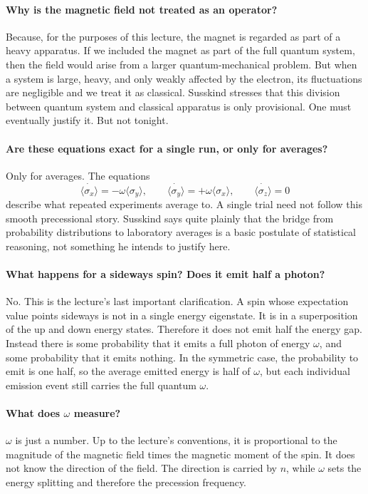\paragraph{Why is the magnetic field not treated as an operator?}
Because, for the purposes of this lecture, the magnet is regarded as part of a heavy apparatus. If we included the magnet as part of the full quantum system, then the field would arise from a larger quantum-mechanical problem. But when a system is large, heavy, and only weakly affected by the electron, its fluctuations are negligible and we treat it as classical. Susskind stresses that this division between quantum system and classical apparatus is only provisional. One must eventually justify it. But not tonight.

\paragraph{Are these equations exact for a single run, or only for averages?}
Only for averages. The equations
\begin{equation}
\dot{\langle \sigma_x\rangle}=-\omega\langle \sigma_y\rangle,
\qquad
\dot{\langle \sigma_y\rangle}=+\omega\langle \sigma_x\rangle,
\qquad
\dot{\langle \sigma_z\rangle}=0
\end{equation}
describe what repeated experiments average to. A single trial need not follow this smooth precessional story. Susskind says quite plainly that the bridge from probability distributions to laboratory averages is a basic postulate of statistical reasoning, not something he intends to justify here.

\paragraph{What happens for a sideways spin? Does it emit half a photon?}
No. This is the lecture's last important clarification. A spin whose expectation value points sideways is not in a single energy eigenstate. It is in a superposition of the up and down energy states. Therefore it does not emit half the energy gap. Instead there is some probability that it emits a full photon of energy \(\omega\), and some probability that it emits nothing. In the symmetric case, the probability to emit is one half, so the average emitted energy is half of \(\omega\), but each individual emission event still carries the full quantum \(\omega\).

\paragraph{What does \(\omega\) measure?}
\(\omega\) is just a number. Up to the lecture's conventions, it is proportional to the magnitude of the magnetic field times the magnetic moment of the spin. It does not know the direction of the field. The direction is carried by \(n\), while \(\omega\) sets the energy splitting and therefore the precession frequency.

